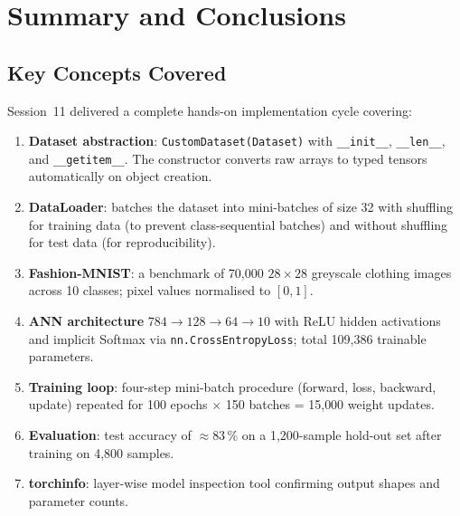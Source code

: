 \documentclass[12pt,a4paper]{article}
\begin{document}
\section{Summary and Conclusions}
\label{sec:summary}

\subsection{Key Concepts Covered}

Session~11 delivered a complete hands-on implementation cycle covering:

\begin{enumerate}[label=\arabic*.]
  \item \textbf{Dataset abstraction}: \texttt{CustomDataset(Dataset)} with
        \texttt{\_\_init\_\_}, \texttt{\_\_len\_\_}, and
        \texttt{\_\_getitem\_\_}.  The constructor converts raw arrays to
        typed tensors automatically on object creation.

  \item \textbf{DataLoader}: batches the dataset into mini-batches of size
        32 with shuffling for training data (to prevent class-sequential
        batches) and without shuffling for test data (for reproducibility).

  \item \textbf{Fashion-MNIST}: a benchmark of 70{,}000 $28\times28$
        greyscale clothing images across 10 classes; pixel values normalised
        to $[0,1]$.

  \item \textbf{ANN architecture} $784 \to 128 \to 64 \to 10$ with ReLU
        hidden activations and implicit Softmax via
        \texttt{nn.CrossEntropyLoss}; total 109{,}386 trainable parameters.

  \item \textbf{Training loop}: four-step mini-batch procedure (forward,
        loss, backward, update) repeated for 100 epochs $\times$ 150
        batches = 15{,}000 weight updates.

  \item \textbf{Evaluation}: test accuracy of $\approx 83\,\%$ on a
        1{,}200-sample hold-out set after training on 4{,}800 samples.

  \item \textbf{torchinfo}: layer-wise model inspection tool confirming
        output shapes and parameter counts.
\end{enumerate}
\end{document}
